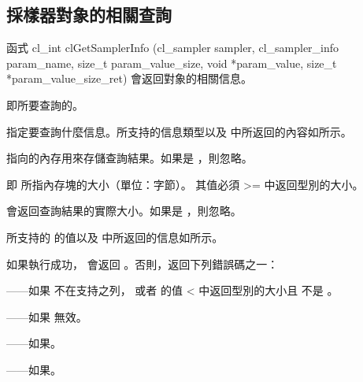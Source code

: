 \subsection{採樣器對象的相關查詢}

函式
\startclc
cl_int clGetSamplerInfo (cl_sampler sampler,
			cl_sampler_info param_name,
			size_t param_value_size,
			void *param_value,
			size_t *param_value_size_ret)
\stopclc
會返回對象的相關信息。

 即所要查詢的。

 指定要查詢什麼信息。所支持的信息類型以及  中所返回的內容如所示。

 指向的內存用來存儲查詢結果。如果是 ，則忽略。

 即  所指內存塊的大小（單位：字節）。
其值必須 >= 中返回型別的大小。

 會返回查詢結果的實際大小。如果是 ，則忽略。

 所支持的  的值以及  中所返回的信息如所示。

{}

如果執行成功， 會返回 。否則，返回下列錯誤碼之一：
\startigBase
\item {}——如果  不在支持之列，
  或者  的值 < 中返回型別的大小且  不是 。
\item {}——如果  無效。
\item {}——如果\scdevfailres。
\item {}——如果\schostfailres。
\stopigBase

